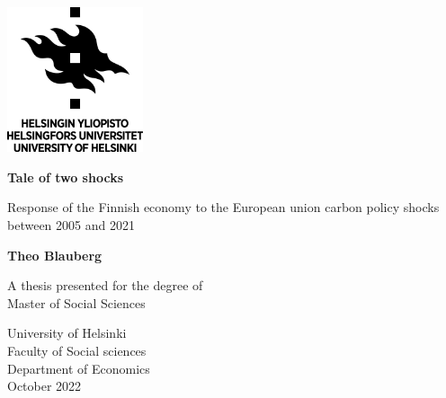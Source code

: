 \begin{titlepage}
    \begin{center}
        \vspace*{1cm}
        
        \includegraphics[width=0.3\textwidth]{latex/university.png}
        
        \vspace{1.5cm}
        
        \textbf{Tale of two shocks}
 
        \vspace{0.5cm}
         Response of the Finnish economy to the European union carbon policy shocks between 2005 and 2021 
             
        \vspace{0.5cm}
 
        \textbf{Theo Blauberg}
 
        \vfill
             
        A thesis presented for the degree of\\
        Master of Social Sciences
             
        \vspace{0.8cm}

    

    
        University of Helsinki\\
        Faculty of Social sciences\\
        Department of Economics\\
        October 2022

    \end{center}         
    
\end{titlepage}
